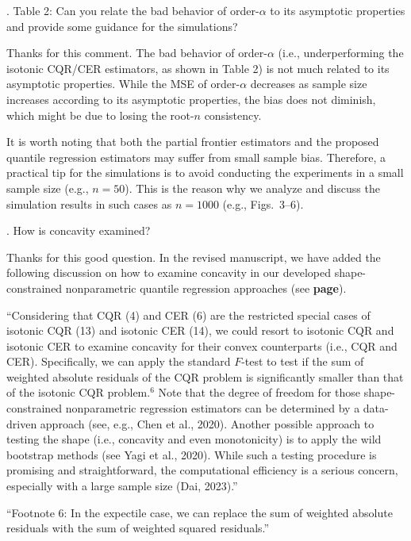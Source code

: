 \documentclass[12pt]{article}
\newcommand{\np}{\vskip 0.3cm}
\begin{document}
 
 \np
 \np
 \np
\begin{sf}
{. Table 2: Can you relate the bad behavior of order-$\alpha$ to its asymptotic properties and provide some guidance for the simulations?}
\end{sf}
\begin{response}
Thanks for this comment. The bad behavior of order-$\alpha$ (i.e., underperforming the isotonic CQR/CER estimators, as shown in Table 2) is not much related to its asymptotic properties. While the MSE of order-$\alpha$ decreases as sample size increases according to its asymptotic properties, the bias does not diminish, which might be due to losing the root-$n$ consistency.\np

It is worth noting that both the partial frontier estimators and the proposed quantile regression estimators may suffer from small sample bias. Therefore, a practical tip for the simulations is to avoid conducting the experiments in a small sample size (e.g., $n=50$). This is the reason why we analyze and discuss the simulation results in such cases as $n=1000$ (e.g., Figs.~3--6).

\end{response}

 
 \np
 \np
 \np
\begin{sf}
{. How is concavity examined?}
\end{sf}
\begin{response}
Thanks for this good question. In the revised manuscript, we have added the following discussion on how to examine concavity in our developed shape-constrained nonparametric quantile regression approaches (see \textbf{page}).\np

``Considering that CQR (4) and CER (6) are the restricted special cases of isotonic CQR (13) and isotonic CER (14), we could resort to isotonic CQR and isotonic CER to examine concavity for their convex counterparts (i.e., CQR and CER). Specifically, we can apply the standard $F$-test to test if the sum of weighted absolute residuals of the CQR problem is significantly smaller than that of the isotonic CQR problem.$^6$ Note that the degree of freedom for those shape-constrained nonparametric regression estimators can be determined by a data-driven approach (see, e.g., Chen et al., 2020). Another possible approach to testing the shape (i.e., concavity and even monotonicity) is to apply the wild bootstrap methods (see Yagi et al., 2020). While such a testing procedure is promising and straightforward, the computational efficiency is a serious concern, especially with a large sample size (Dai, 2023).''\np

``Footnote 6: In the expectile case, we can replace the sum of weighted absolute residuals with the sum of weighted squared residuals.''

\end{response}
\end{document}
